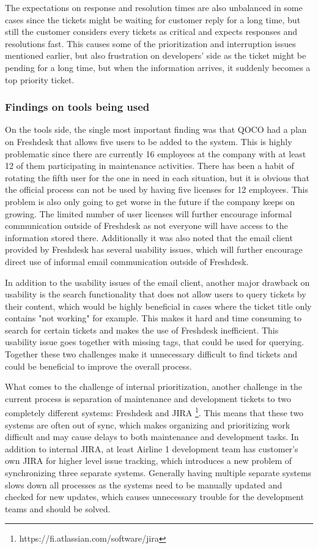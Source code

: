 The expectations on response and resolution times are also unbalanced in some cases since the tickets might be waiting for customer reply for a long time, but still the customer
considers every tickets as critical and expects responses and resolutions fast. This causes some of the prioritization and interruption issues mentioned earlier, but also frustration
on developers' side as the ticket might be pending for a long time, but when the information arrives, it suddenly becomes a top priority ticket.

\subsubsection*{Findings on tools being used}

On the tools side, the single most important finding was that QOCO had a plan on Freshdesk that allows five users to be added to the system. This is highly problematic since there are currently 16 employees at the company with at least 12 of them participating in maintenance activities. There has been a habit of rotating the fifth user for the one
in need in each situation, but it is obvious that the official process can not be used by having five licenses for 12 employees. This problem is also only going to get worse in the future
if the company keeps on growing. The limited number of user licenses will further encourage informal communication outside of Freshdesk as not everyone will have access to the information
stored there. Additionally it was also noted that the email client provided by Freshdesk has several usability issues, which will further encourage direct use of informal email
communication outside of Freshdesk.

In addition to the usability issues of the email client, another major drawback on usability is the search functionality that does not allow users to query tickets by their content, which would
be highly beneficial in cases where the ticket title only contains "not working" for example. This makes it hard and time consuming to search for certain tickets and makes the use of
Freshdesk inefficient. This usability issue goes together with missing tags, that could be used for querying. Together these two challenges make it unnecessary difficult to find tickets
and could be beneficial to improve the overall process.

What comes to the challenge of internal prioritization, another challenge in the current process is separation of maintenance and development tickets to two completely different systems:
Freshdesk and JIRA \footnote{https://fi.atlassian.com/software/jira}.
This means that these two systems are often out of sync, which makes organizing and prioritizing work difficult and may cause delays to both maintenance and development tasks.
In addition to internal JIRA, at least Airline 1 development team has customer's own JIRA for higher level issue tracking, which introduces a new problem of synchronizing three separate systems.
Generally having multiple separate systems slows down all processes as the systems need to be manually updated and checked for new updates, which causes unnecessary trouble for the development
teams and should be solved.

